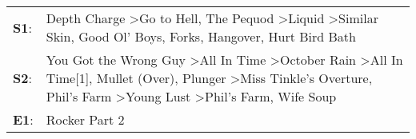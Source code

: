 \begin{supertabular}{p{0.03\textwidth}p{0.92\textwidth}}
 \textbf{S1}:  &                                                                                                                                                   Depth Charge\textsuperscript{} \textgreater \enspace Go to Hell\textsuperscript{}, \enspace The Pequod\textsuperscript{} \textgreater \enspace Liquid\textsuperscript{} \textgreater \enspace Similar Skin\textsuperscript{}, \enspace Good Ol' Boys\textsuperscript{}, \enspace Forks\textsuperscript{}, \enspace Hangover\textsuperscript{}, \enspace Hurt Bird Bath\textsuperscript{}  \enspace  \\
 \textbf{S2}:  &  You Got the Wrong Guy\textsuperscript{} \textgreater \enspace All In Time\textsuperscript{} \textgreater \enspace October Rain\textsuperscript{} \textgreater \enspace All In Time[1]\textsuperscript{}, \enspace Mullet (Over)\textsuperscript{}, \enspace Plunger\textsuperscript{} \textgreater \enspace Miss Tinkle's Overture\textsuperscript{}, \enspace Phil's Farm\textsuperscript{} \textgreater \enspace Young Lust\textsuperscript{} \textgreater \enspace Phil's Farm\textsuperscript{}, \enspace Wife Soup\textsuperscript{}  \enspace  \\
 \textbf{E1}:  &                                                                                                                                                                                                                                                                                                                                                                                                                                                                                                            Rocker Part 2\textsuperscript{}  \enspace  \\
\end{supertabular}
